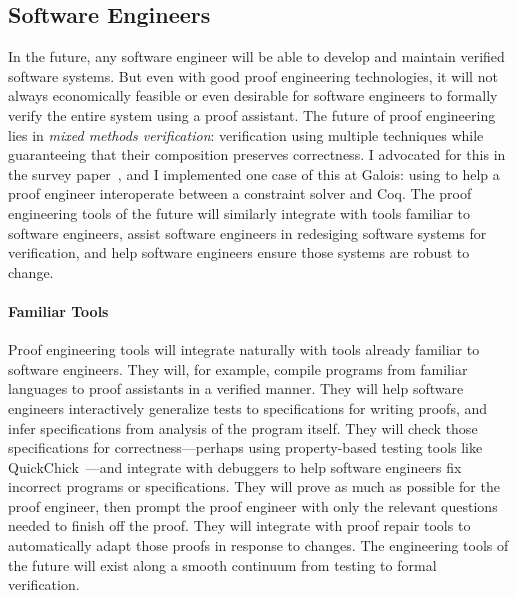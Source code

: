 \subsection*{Software Engineers}

In the future, any software engineer will be able to develop and maintain verified software systems.
But even with good proof engineering technologies, it will not always economically feasible or even desirable for software engineers to formally verify 
the entire system using a proof assistant.
The future of proof engineering lies in \textit{mixed methods verification}:
verification using multiple techniques while guaranteeing that their composition preserves correctness.
I advocated for this in the survey paper~\cite{PGL-045}, and I implemented one case of this at Galois: using
\sysnamelong to help a proof engineer interoperate between a constraint solver and Coq.
The proof engineering tools of the future will similarly integrate with tools familiar to software engineers,
assist software engineers in redesiging software systems for verification,
and help software engineers ensure those systems are robust to change.

\paragraph{Familiar Tools}
Proof engineering tools will integrate naturally with tools already familiar to software engineers.
They will, for example, compile programs from familiar languages to proof assistants in a verified manner.
They will help software engineers interactively generalize tests to specifications for writing proofs,
and infer specifications from analysis of the program itself.
They will check those specifications for correctness---perhaps using property-based testing tools 
like QuickChick~\cite{Paraskevopoulou2015, lampropoulos2017generating}---and integrate with debuggers to help software engineers 
fix incorrect programs or specifications.
They will prove as much as possible for the proof engineer, then prompt the proof engineer with only the relevant questions
needed to finish off the proof.
They will integrate with proof repair tools to automatically adapt those proofs in response to changes.
The engineering tools of the future will exist along a smooth continuum from testing to formal verification.

